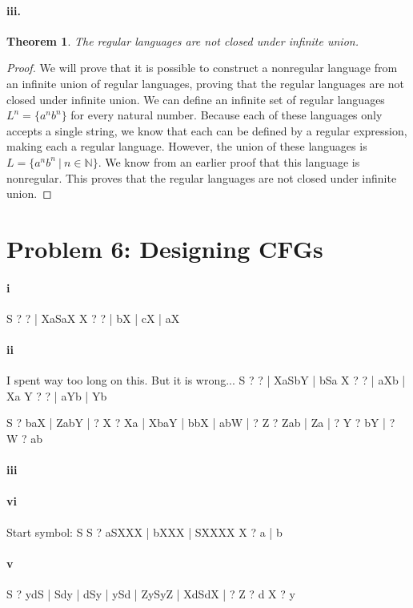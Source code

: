 \documentclass[10pt,letter]{article}
\newtheorem*{thm}{Theorem}
\begin{document}
\paragraph{iii.}
\begin{thm} The regular languages are not closed under infinite union. \end{thm}
\begin{proof}
We will prove that it is possible to construct a nonregular language from an infinite union of regular languages, proving that the regular languages are not closed under infinite union. We can define an infinite set of regular languages $L^n = \{a^n b^n\}$ for every natural number. Because each of these languages only accepts a single string, we know that each can be defined by a regular expression, making each a regular language. However, the union of these languages is $L = \{ a^n b^n \ | \ n \in \mathbb{N} \}$. We know from an earlier proof that this language is nonregular. This proves that the regular languages are not closed under infinite union.
\end{proof}

\section*{Problem 6: Designing CFGs}
\paragraph{i}
S ? ? | XaSaX
X ? ? | bX | cX | aX

\paragraph{ii}
I spent way too long on this. But it is wrong...
S ? ? | XaSbY | bSa
X ? ? | aXb | Xa
Y ? ? | aYb | Yb

S ? baX | ZabY | ?
X ? Xa | XbaY | bbX | abW | ?
Z ? Zab | Za | ?
Y ? bY | ?
W ? ab

\paragraph{iii}


\paragraph{vi}
Start symbol: S
S ? aSXXX | bXXX | SXXXX
X ? a | b

\paragraph{v}
S ? ydS | Sdy | dSy | ySd | ZySyZ | XdSdX | ?
Z ? d
X ? y
\end{document}

